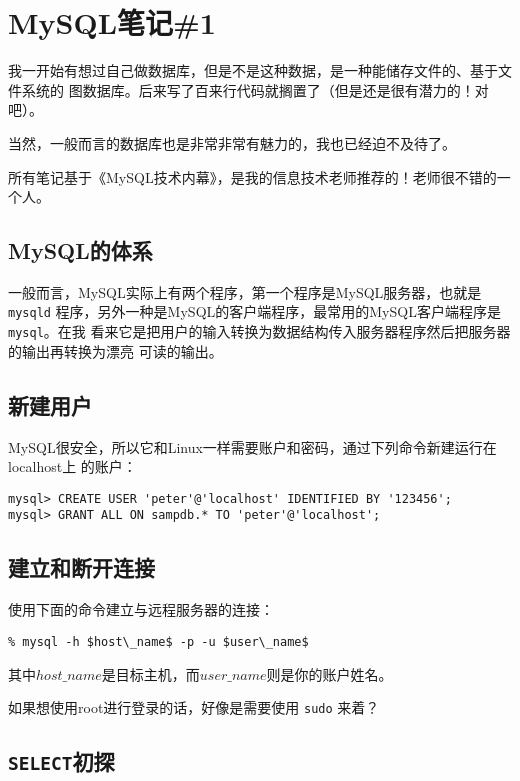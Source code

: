 
\section{MySQL笔记\#1}

我一开始有想过自己做数据库，但是不是这种数据，是一种能储存文件的、基于文件系统的
图数据库。后来写了百来行代码就搁置了（但是还是很有潜力的！对吧）。

当然，一般而言的数据库也是非常非常有魅力的，我也已经迫不及待了。

所有笔记基于《MySQL技术内幕》，是我的信息技术老师推荐的！老师很不错的一个人。

\subsection{MySQL的体系}

一般而言，MySQL实际上有两个程序，第一个程序是MySQL服务器，也就是 \verb|mysqld| %
程序，另外一种是MySQL的客户端程序，最常用的MySQL客户端程序是 \verb|mysql|。在我
看来它是把用户的输入转换为数据结构传入服务器程序然后把服务器的输出再转换为漂亮
可读的输出。

\subsection{新建用户}

MySQL很安全，所以它和Linux一样需要账户和密码，通过下列命令新建运行在localhost上
的账户：
\begin{lstlisting}
mysql> CREATE USER 'peter'@'localhost' IDENTIFIED BY '123456';
mysql> GRANT ALL ON sampdb.* TO 'peter'@'localhost';
\end{lstlisting}

\subsection{建立和断开连接}

使用下面的命令建立与远程服务器的连接：
\begin{lstlisting}
% mysql -h $host\_name$ -p -u $user\_name$
\end{lstlisting}

其中$host\_name$是目标主机，而$user\_name$则是你的账户姓名。

如果想使用root进行登录的话，好像是需要使用 \verb|sudo| 来着？

\subsection{{\tt SELECT}初探}

